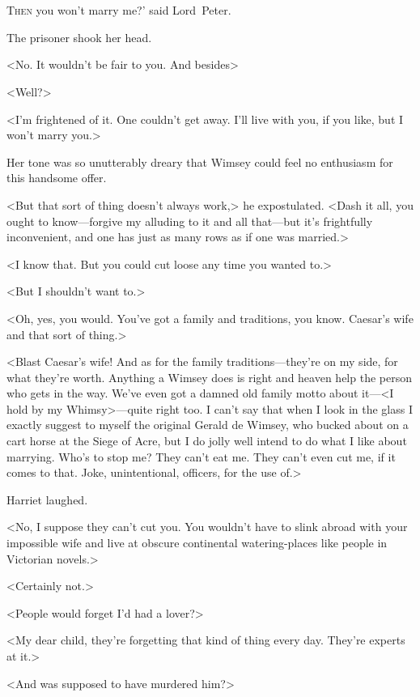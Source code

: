 \chapter[Chapter \thechapter]{}
\lettrine[ante=`]{T}{hen}  you won't marry me?' said Lord~Peter.

\zz
The prisoner shook her head.

\zz
<No. It wouldn't be fair to you. And besides\longdash>

\zz
<Well?>

<I'm frightened of it. One couldn't get away. I'll live with you, if you like, but I won't marry you.>

Her tone was so unutterably dreary that Wimsey could feel no enthusiasm for this handsome offer.

<But that sort of thing doesn't always work,> he expostulated. <Dash it all, you ought to know—forgive my alluding to it and all that—but it's frightfully inconvenient, and one has just as many rows as if one was married.>

<I know that. But you could cut loose any time you wanted to.>

<But I shouldn't want to.>

<Oh, yes, you would. You've got a family and traditions, you know. Caesar's wife and that sort of thing.>

<Blast Caesar's wife! And as for the family traditions—they're on my side, for what they're worth. Anything a Wimsey does is right and heaven help the person who gets in the way. We've even got a damned old family motto about it—<I hold by my Whimsy>—quite right too. I can't say that when I look in the glass I exactly suggest to myself the original Gerald de Wimsey, who bucked about on a cart horse at the Siege of Acre, but I do jolly well intend to do what I like about marrying. Who's to stop me? They can't eat me. They can't even cut me, if it comes to that. Joke, unintentional, officers, for the use of.>

Harriet laughed.

<No, I suppose they can't cut you. You wouldn't have to slink abroad with your impossible wife and live at obscure continental watering-places like people in Victorian novels.>

<Certainly not.>

<People would forget I'd had a lover?>

<My dear child, they're forgetting that kind of thing every day. They're experts at it.>

<And was supposed to have murdered him?>

